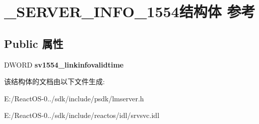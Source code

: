 \hypertarget{struct___s_e_r_v_e_r___i_n_f_o__1554}{}\section{\+\_\+\+S\+E\+R\+V\+E\+R\+\_\+\+I\+N\+F\+O\+\_\+1554结构体 参考}
\label{struct___s_e_r_v_e_r___i_n_f_o__1554}
\subsection*{Public 属性}
\begin{DoxyCompactItemize}
\item 
\mbox{\label{struct___s_e_r_v_e_r___i_n_f_o__1554_a8c97a366c3bf39dc6f031168280d2acd}} 
D\+W\+O\+RD {\bfseries sv1554\+\_\+linkinfovalidtime}
\end{DoxyCompactItemize}


该结构体的文档由以下文件生成\+:\begin{DoxyCompactItemize}
\item 
E\+:/\+React\+O\+S-\/0../sdk/include/psdk/lmserver.\+h\item 
E\+:/\+React\+O\+S-\/0../sdk/include/reactos/idl/srvsvc.\+idl\end{DoxyCompactItemize}
